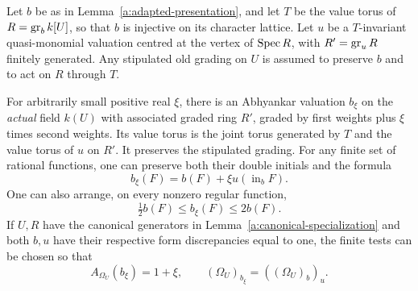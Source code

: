\begin{lemma}\label{a:flattening}
Let \(b\) be as in Lemma~\ref{a:adapted-presentation}, and let \(T\) be
the value torus of \(R=\operatorname{gr}_b k[U]\), so that \(b\) is injective on its
character lattice. Let \(u\) be a \(T\)-invariant quasi-monomial valuation
centred at the vertex of \(\operatorname{Spec} R\), with \(R'=\operatorname{gr}_u R\) finitely
generated. Any stipulated old grading on \(U\) is assumed to preserve
\(b\) and to act on \(R\) through \(T\).

For arbitrarily small positive real \(\xi\), there is an Abhyankar
valuation \(b_\xi\) on the \emph{actual} field \(k(U)\) with associated
graded ring \(R'\), graded by first weights plus \(\xi\) times second
weights. Its value torus is the joint torus generated by \(T\) and the
value torus of \(u\) on \(R'\). It preserves the stipulated grading.
For any finite set of rational functions, one can preserve both their
double initials and the formula
\[
              b_\xi(F)=b(F)+\xi u(\operatorname{in}_b F).
\]
One can also arrange, on every nonzero regular function,
\[
                    \tfrac12 b(F)\leq b_\xi(F)\leq2b(F).
\]
If \(U,R\) have the canonical generators in
Lemma~\ref{a:canonical-specialization} and both \(b,u\) have their
respective form discrepancies equal to one, the finite tests can be
chosen so that
\[
 A_{\Omega_U}(b_\xi)=1+\xi,\qquad
          (\Omega_U)_{b_\xi}=((\Omega_U)_b)_u.
\]
\end{lemma}

